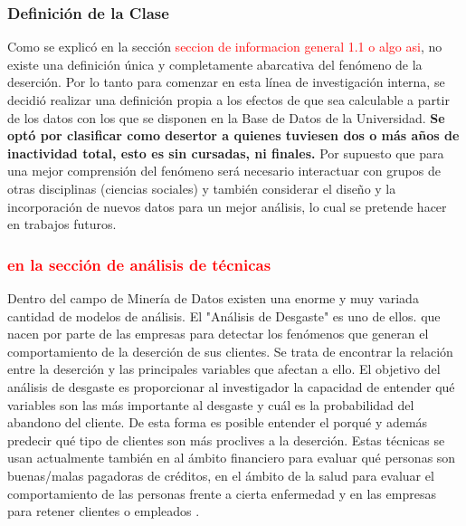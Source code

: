 \subsubsection{Definición de la Clase}

Como se explicó en la sección \textcolor{red}{seccion de informacion general 1.1 o algo asi}, no existe una definición única y completamente abarcativa del fenómeno de la deserción. 
Por lo tanto para comenzar en esta línea de investigación interna, se decidió realizar una definición propia a los efectos de que sea calculable a partir de los datos con los que se disponen en la  Base de Datos de la Universidad. \textbf{Se optó por clasificar como desertor a quienes tuviesen dos o más años de inactividad total, esto es sin cursadas, ni finales.}
Por supuesto que para una mejor comprensión del fenómeno será necesario interactuar con grupos de otras disciplinas (ciencias sociales) y también considerar el diseño y  la incorporación de nuevos datos para un mejor análisis, lo cual se pretende hacer en trabajos futuros.



\subsubsection{\textcolor{red}{en la sección de análisis de técnicas}}
Dentro del campo de Minería de Datos existen una enorme y muy variada cantidad de modelos de análisis. El "Análisis de Desgaste" es uno de ellos. que nacen por parte de las empresas para detectar los fenómenos que generan el comportamiento de la deserción de sus clientes. Se trata de encontrar la relación entre la deserción y las principales variables que afectan a ello. El objetivo del análisis de desgaste es proporcionar al investigador la capacidad de entender qué variables son las más importante al desgaste y cuál es la probabilidad del abandono del cliente. De esta forma es posible entender el porqué y además predecir qué tipo de clientes son más proclives a la deserción. Estas técnicas se usan actualmente también en al ámbito financiero para evaluar qué personas son buenas/malas pagadoras de créditos, en el ámbito de la salud para evaluar el comportamiento de las personas frente a cierta enfermedad y en las empresas para retener clientes o empleados \cite{Chapman1982AttritionAnalysis}.



